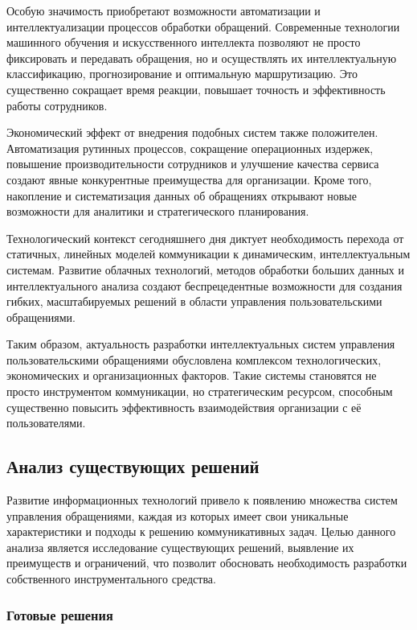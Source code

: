 Особую значимость приобретают возможности автоматизации и интеллектуализации процессов обработки обращений. Современные технологии машинного обучения и искусственного интеллекта позволяют не просто фиксировать и передавать обращения, но и осуществлять их интеллектуальную классификацию, прогнозирование и оптимальную маршрутизацию. Это существенно сокращает время реакции, повышает точность и эффективность работы сотрудников.

Экономический эффект от внедрения подобных систем также положителен. Автоматизация рутинных процессов, сокращение операционных издержек, повышение производительности сотрудников и улучшение качества сервиса создают явные конкурентные преимущества для организации. Кроме того, накопление и систематизация данных об обращениях открывают новые возможности для аналитики и стратегического планирования.

Технологический контекст сегодняшнего дня диктует необходимость перехода от статичных, линейных моделей коммуникации к динамическим, интеллектуальным системам. Развитие облачных технологий, методов обработки больших данных и интеллектуального анализа создают беспрецедентные возможности для создания гибких, масштабируемых решений в области управления пользовательскими обращениями.

Таким образом, актуальность разработки интеллектуальных систем управления пользовательскими обращениями обусловлена комплексом технологических, экономических и организационных факторов. Такие системы становятся не просто инструментом коммуникации, но стратегическим ресурсом, способным существенно повысить эффективность взаимодействия организации с её пользователями.

\subsection{Анализ существующих решений}

Развитие информационных технологий привело к появлению множества систем управления обращениями, каждая из которых имеет свои уникальные характеристики и подходы к решению коммуникативных задач. Целью данного анализа является исследование существующих решений, выявление их преимуществ и ограничений, что позволит обосновать необходимость разработки собственного инструментального средства.

\subsubsection{Готовые решения}

